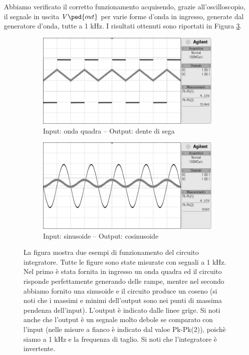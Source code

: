 Abbiamo verificato il corretto funzionamento acquisendo, grazie all'oscilloscopio, il segnale in uscita $V\ped{out}$ per varie forme d'onda in ingresso, generate dal generatore d'onda, tutte a 1 kHz.
I risultati ottenuti sono riportati in Figura \ref{fig:iint}.

\begin{figure}[t]
    \centering
    \begin{subfigure}[t]{0.49\textwidth}
        \includegraphics[width=\textwidth]{s10.png}
        \caption{Input: onda quadra -- Output: dente di sega}
        \label{fig:a1}
    \end{subfigure}
    \begin{subfigure}[t]{0.49\textwidth}
        \includegraphics[width=\textwidth]{s11.png}
        \caption{Input: sinusoide -- Output: cosinusoide}
        \label{fig:a2}
    \end{subfigure}
    \caption{La figura mostra due esempi di funzionamento del circuito integratore. Tutte le figure
        sono state misurate con segnali a 1 kHz. Nel primo è stata fornita in ingresso
    un onda quadra ed il circuito risponde perfettamente generando delle rampe, mentre nel secondo abbiamo fornito una sinusoide
    e il circuito produce un coseno (si noti che i massimi e minimi dell'output sono nei punti di massima pendenza dell'input).
    L'output è indicato dalle linee grige. Si noti anche che l'output è un segnale molto debole se comparato con l'input
    (nelle misure a fianco è indicato dal valoe Pk-Pk(2)), poichè siamo a 1 kHz e la frequenza di taglio. Si noti che
    l'integratore è invertente.
    }
    \label{fig:iint}
\end{figure}

